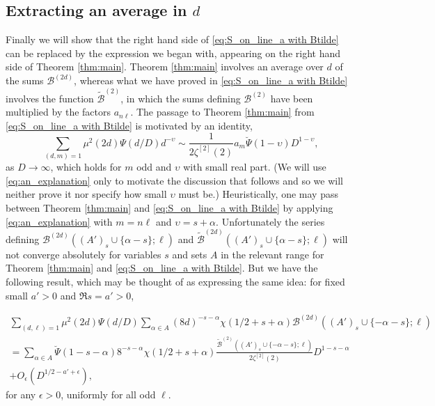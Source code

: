 \documentclass[12pt]{amsart}
\begin{document}
	
	\subsection{Extracting an average in $d$}
	
	Finally we will show that the right hand side of \eqref{eq:S_on_line_a with Btilde} can be replaced by the expression we began with, appearing on the right hand side of Theorem \ref{thm:main}. Theorem \ref{thm:main} involves an average over $d$ of the sums $\mathcal{B}^{(2d)}$, whereas what we have proved in \eqref{eq:S_on_line_a with Btilde} involves the function $\tilde{\mathcal{B}}^{(2)}$, in which the sums defining $\mathcal{B}^{(2)}$ have been multiplied by the factors $a_{n\ell}$. The passage to Theorem \ref{thm:main} from \eqref{eq:S_on_line_a with Btilde} is motivated by an identity,
	\begin{equation}
		\label{eq:an_explanation}
		\sum_{(d,m)=1} \mu^2(2d) \Psi(d/D) d^{-\upsilon} \sim \frac{1}{2\zeta^{[2]}(2)} a_m \breve{\Psi}(1-\upsilon) D^{1-\upsilon},
	\end{equation}
	as $D\rightarrow\infty$, which holds for $m$ odd and $\upsilon$ with small real part. (We will use \eqref{eq:an_explanation} only to motivate the discussion that follows and so we will neither prove it nor specify how small $\upsilon$ must be.) Heuristically, one may pass between Theorem \ref{thm:main} and \eqref{eq:S_on_line_a with Btilde} by applying \eqref{eq:an_explanation} with $m = n\ell$ and $\upsilon = s+\alpha$. Unfortunately the series defining $\mathcal{B}^{(2d)}((A')_s \cup \{\alpha - s\};\ell)$ and $\tilde{\mathcal{B}}^{(2d)}((A')_s \cup \{\alpha - s\};\ell)$ will not converge absolutely for variables $s$ and sets $A$ in the relevant range for Theorem \ref{thm:main} and \eqref{eq:S_on_line_a with Btilde}. But we have the following result, which may be thought of as expressing the same idea: for fixed small $a' >0$ and $\Re s = a' > 0$,
	
	\begin{multline}
		\label{eq:B_to_Btilde}
		\sum_{(d,\ell)=1} \mu^2(2d) \Psi(d/D) \sum_{\alpha \in A} (8d)^{-s-\alpha} \chi(1/2+s+\alpha) \mathcal{B}^{(2d)}((A')_s \cup \{-\alpha-s\};\ell) \\
		= \sum_{\alpha \in A} \breve{\Psi}(1-s-\alpha) 8^{-s-\alpha} \chi(1/2+s+\alpha) \frac{\tilde{\mathcal{B}}^{(2)}((A')_s \cup \{-\alpha-s\};\ell)}{2\zeta^{[2]}(2)}  D^{1-s-\alpha} \\
		+ O_\epsilon(D^{1/2-a'+\epsilon}),
	\end{multline}
	for any $\epsilon > 0$, uniformly for all odd $\ell$.
	
\end{document}
